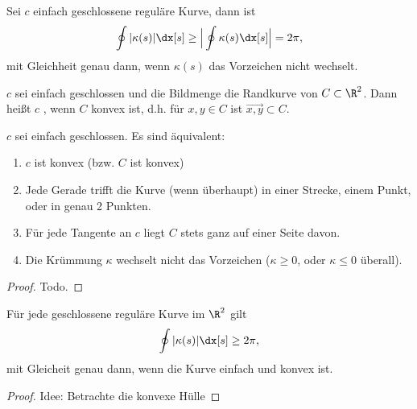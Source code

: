 \begin{kor}
	Sei $c$ einfach geschlossene reguläre Kurve, dann ist
	\[
		\oint |\kappa(s)| \dx[s]
		\ge \Big| \oint \kappa(s) \dx[s] \Big|
		= 2\pi,
	\]
	mit Gleichheit genau dann, wenn $\kappa(s)$ das Vorzeichen nicht wechselt.
\end{kor}

\begin{df}
	$c$ sei einfach geschlossen und die Bildmenge die Randkurve von $C \subset \R^2$.
	Dann heißt $c$ , wenn $C$ konvex ist, d.h. für $x,y \in C$ ist $\vec{x,y} \subset C$.
\end{df}

\begin{st}
	$c$ sei einfach geschlossen.
	Es sind äquivalent:
	\begin{enumerate}[1)]
		\item
			$c$ ist konvex (bzw. $C$ ist konvex)
		\item
			Jede Gerade trifft die Kurve (wenn überhaupt) in einer Strecke, einem Punkt, oder in genau 2 Punkten.
		\item
			Für jede Tangente an $c$ liegt $C$ stets ganz auf einer Seite davon.
		\item
			Die Krümmung $\kappa$ wechselt nicht das Vorzeichen ($\kappa \ge 0$, oder $\kappa \le 0$ überall).
	\end{enumerate}
	\begin{proof}
		Todo.
	\end{proof}
\end{st}

\begin{kor}
	Für jede geschlossene reguläre Kurve im $\R^2$ gilt
	\[
		\oint |\kappa(s)| \dx[s]
		\ge 2\pi,
	\]
	mit Gleicheit genau dann, wenn die Kurve einfach und konvex ist.
	\begin{proof}
		Idee: Betrachte die konvexe Hülle
	\end{proof}
\end{kor}


